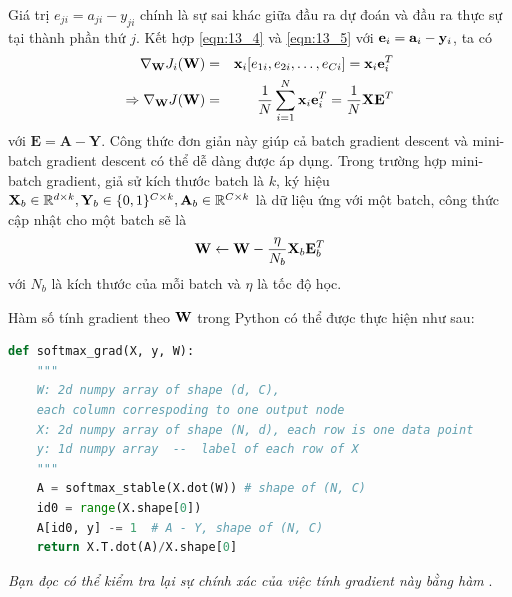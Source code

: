 Giá trị $e_{ji} = a_{ji} - y_{ji}$ chính là sự sai khác giữa đầu ra dự đoán và
đầu ra thực sự tại thành phần thứ $j$. Kết hợp \eqref{eqn:13_4} và
\eqref{eqn:13_5} với $\mathbf{e}_i = \mathbf{a}_i - \mathbf{y}_i$, ta có
\begin{eqnarray}
\nabla_{\mathbf{W}}J_i(\mathbf{W})
&=& \mathbf{x}_i [e_{1i}, e_{2i}, \dots, e_{Ci}] = \mathbf{x}_i\mathbf{e}_i^T \\
\Rightarrow \nabla_{\mathbf{W}}J(\mathbf{W})
&=& \frac{1}{N}\sum_{i=1}^N
\mathbf{x}_i\mathbf{e}_i^T = \frac{1}{N}\mathbf{X}\mathbf{E}^T
\end{eqnarray}
với $\mathbf{E} = \mathbf{A - Y}$. Công thức đơn giản này giúp cả batch gradient descent và mini-batch gradient descent có thể dễ dàng
được áp dụng. Trong trường hợp mini-batch gradient, giả sử kích thước batch là
$k$, ký hiệu $\mathbf{X}_b \in \mathbb{R}^{d \times k}, \mathbf{Y}_b \in \{0, 1\}^{C \times k},
\mathbf{A}_b \in \mathbb{R}^{C \times k}$ là dữ liệu ứng với một batch, công thức cập nhật cho
một batch sẽ là
\begin{equation}
\mathbf{W} \leftarrow \mathbf{W} - \frac{\eta}{N_b}\mathbf{X}_b\mathbf{E}_b^T
\end{equation}
với $N_b$ là kích thước của mỗi batch và $\eta$ là tốc độ học.

Hàm số tính gradient theo $\mathbf{W}$ trong Python có thể được thực hiện như sau:
\begin{lstlisting}[language=Python]
def softmax_grad(X, y, W):
    """
    W: 2d numpy array of shape (d, C),
    each column correspoding to one output node
    X: 2d numpy array of shape (N, d), each row is one data point
    y: 1d numpy array  --  label of each row of X
    """
    A = softmax_stable(X.dot(W)) # shape of (N, C)
    id0 = range(X.shape[0])
    A[id0, y] -= 1  # A - Y, shape of (N, C)
    return X.T.dot(A)/X.shape[0]
\end{lstlisting}
\textit{Bạn đọc có thể kiểm tra lại sự chính xác của việc tính gradient này bằng hàm }.

